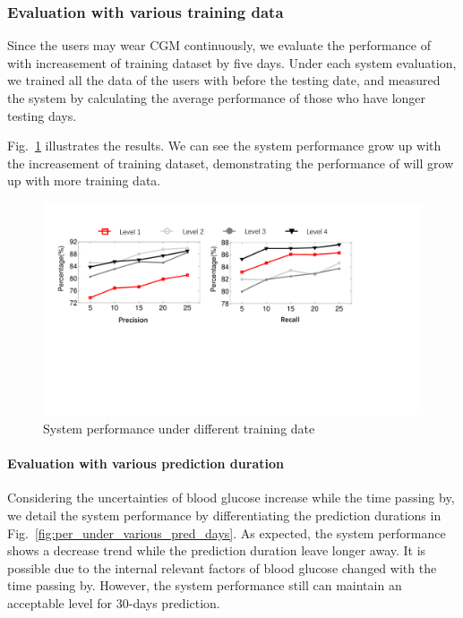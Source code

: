 \subsubsection{Evaluation with various training data}

Since the users may wear CGM continuously, we evaluate the performance of \sysname with increasement of training dataset by five days. Under each system evaluation, we trained all the data of the users with before the testing date, and measured the system by calculating the average performance of those who have longer testing days.

Fig.~\ref{fig:per_under_train_days} illustrates the results. We can see the system performance grow up with the increasement of training dataset, demonstrating the performance of \sysname will grow up with more training data.


\begin{figure}[!t]
\centering
\includegraphics[width=0.9\columnwidth]{./img/performance_under_days.pdf}
\caption{System performance under different training date}
\label{fig:per_under_train_days}
\end{figure}



\paragraph{Evaluation with various prediction duration}

Considering the uncertainties of blood glucose increase while the time passing by, we detail the system performance by differentiating the prediction durations in  Fig.~\ref{fig:per_under_various_pred_days}.
As expected, the system performance shows a decrease trend while the prediction duration leave longer away. It is possible due to the internal relevant factors of blood glucose changed with the time passing by. However, the system performance still can maintain an acceptable level for 30-days prediction.



